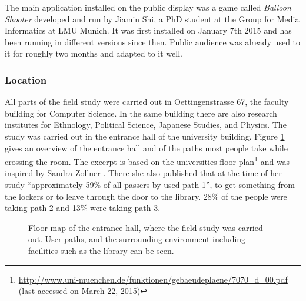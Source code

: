 

		The main application installed on the public display was a game called \textit{Balloon Shooter} developed and run by Jiamin Shi, a PhD student at the Group for Media Informatics at LMU Munich. It was first installed on January 7th 2015 and has been running in different versions since then. Public audience was already used to it for roughly two months and adapted to it well.





	\subsubsection{Location}

	All parts of the field study were carried out in Oettingenstrasse 67, the faculty building for Computer Science. In the same building there are also research institutes for Ethnology, Political Science, Japanese Studies, and Physics. The study was carried out in the entrance hall of the university building. Figure \ref{fig:5-entrance-hall} gives an overview of the entrance hall and of the paths most people take while crossing the room. The excerpt is based on the universities floor plan\footnote{\url{http://www.uni-muenchen.de/funktionen/gebaeudeplaene/7070_d_00.pdf} (last accessed on March 22, 2015)} and was inspired by Sandra Zollner \cite{zollner2014thesis}. There she also published that at the time of her study ``approximately 59\% of all passers-by used path 1'', to get something from the lockers or to leave through the door to the library. 28\% of the people were taking path 2 and 13\% were taking path 3.

	\begin{figure}
	    \begin{center}
	    \end{center}
	 \caption[Floor Map of Entrance Hall]{Floor map of the entrance hall, where the field study was carried out. User paths, and the surrounding environment including facilities such as the library can be seen.}
	 \label{fig:5-entrance-hall}
	\end{figure}


